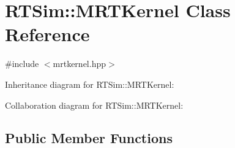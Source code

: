 \hypertarget{classRTSim_1_1MRTKernel}{}\section{R\+T\+Sim\+:\+:M\+R\+T\+Kernel Class Reference}
\label{classRTSim_1_1MRTKernel}


{\ttfamily \#include $<$mrtkernel.\+hpp$>$}



Inheritance diagram for R\+T\+Sim\+:\+:M\+R\+T\+Kernel\+:


Collaboration diagram for R\+T\+Sim\+:\+:M\+R\+T\+Kernel\+:
\subsection*{Public Member Functions}
